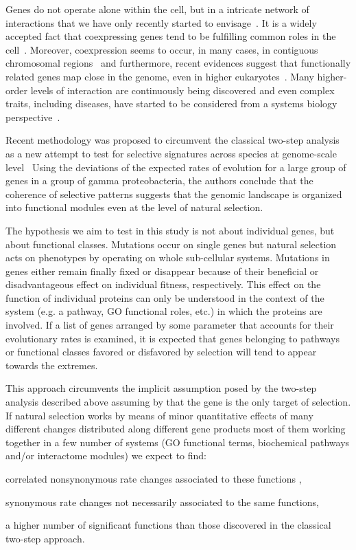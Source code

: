 Genes do not operate alone within the cell, but in a intricate network of interactions that we have only recently started to envisage~\cite{Stelzl2005}. It is a widely accepted fact that coexpressing genes tend to be fulfilling common roles in the cell~\cite{Lee2003}. Moreover, coexpression seems to occur, in many cases, in contiguous chromosomal regions~\cite{Caron2001} and furthermore, recent evidences suggest that functionally related genes map close in the genome, even in higher eukaryotes~\cite{Hurst2004}. Many higher-order levels of interaction are continuously being discovered and even complex traits, including diseases, have started to be considered from a systems biology perspective~\cite{Ideker2008,Vamathevan2008}.

Recent methodology was proposed to circumvent the classical two-step analysis as a new attempt to test for selective signatures across species at genome-scale level~\cite{Shapiro2008} Using the deviations of the expected rates of evolution for a large group of genes in a group of gamma proteobacteria, the authors conclude that the coherence of selective patterns suggests that the genomic landscape is organized into functional modules even at the level of natural selection.

The hypothesis we aim to test in this study is not about individual genes, but about functional classes. Mutations occur on single genes but natural selection acts on phenotypes by operating on whole sub-cellular systems. Mutations in genes either remain finally fixed or disappear because of their beneficial or disadvantageous effect on individual fitness, respectively. This effect on the function of individual proteins can only be understood in the context of the system (e.g. a pathway, GO functional roles, etc.) in which the proteins are involved. If a list of genes arranged by some parameter that accounts for their evolutionary rates is examined, it is expected that genes belonging to pathways or functional classes favored or disfavored by selection will tend to appear towards the extremes.

This approach circumvents the implicit assumption posed by the two-step analysis described above assuming by that the gene is the only target of selection. If natural selection works by means of minor quantitative effects of many different changes distributed along different gene products most of them working together in a few number of systems (GO functional terms, biochemical pathways and/or interactome modules) we expect to find: \begin{inparaenum}[ 1-] \item correlated nonsynonymous rate changes associated to these functions , \item synonymous rate changes not necessarily associated to the same functions, \item a higher number of significant functions than those discovered in the classical two-step approach.\end{inparaenum}


